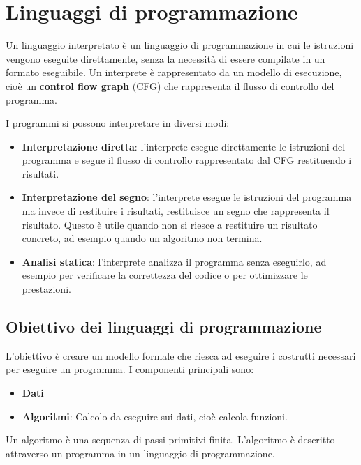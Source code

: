 \documentclass[a4paper]{article}
\begin{document}


\tableofcontents
\pagebreak

\section{Linguaggi di programmazione}
Un linguaggio interpretato è un linguaggio di programmazione in cui le istruzioni vengono
eseguite direttamente, senza la necessità di essere compilate in un formato eseguibile.
Un interprete è rappresentato da un modello di esecuzione, cioè un \textbf{control
flow graph} (CFG) che rappresenta il flusso di controllo del programma.

I programmi si possono interpretare in diversi modi:
\begin{itemize}
  \item \textbf{Interpretazione diretta}: l'interprete esegue direttamente le istruzioni del
    programma e segue il flusso di controllo rappresentato dal CFG restituendo i risultati.

  \item \textbf{Interpretazione del segno}: l'interprete esegue le istruzioni del programma
    ma invece di restituire i risultati, restituisce un segno che rappresenta il risultato.
    Questo è utile quando non si riesce a restituire un risultato concreto, ad esempio quando
    un algoritmo non termina.

  \item \textbf{Analisi statica}: l'interprete analizza il programma senza eseguirlo, ad
    esempio per verificare la correttezza del codice o per ottimizzare le prestazioni.
\end{itemize}


\subsection{Obiettivo dei linguaggi di programmazione}
\noindent
L'obiettivo è creare un modello formale che riesca ad eseguire i costrutti necessari
per eseguire un programma. I componenti principali sono:
\begin{itemize}
  \item \textbf{Dati}
  \item \textbf{Algoritmi}: Calcolo da eseguire sui dati, cioè calcola funzioni.
\end{itemize}

\vspace{1em}
\noindent

\begin{definition}[Algoritmo]
    Un algoritmo è una sequenza di passi primitivi finita. L'algoritmo è descritto
    attraverso un programma in un linguaggio di programmazione.
\end{definition}
\end{document}
